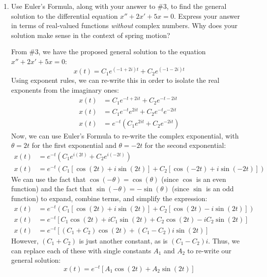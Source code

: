 \documentclass[main]{subfiles}
\begin{document}
\begin{enumerate}
\begin{enumerate}
    
\end{enumerate}
 \probonly{\end{multicols}}

\pspace{1.25in}

\item
{}

\begin{problem}[3in]
Use Euler's Formula, along with your answer to \#3, to find the general solution to the differential equation $x'' + 2x' + 5x = 0$. Express your answer in terms of real-valued functions \textit{without} complex numbers. Why does your solution make sense in the context of spring motion?
\end{problem}
  
\begin{solution}
From \#3, we have the proposed general solution to the equation $x'' + 2x' + 5x = 0$:
$$x(t)=C_1e^{(-1+2i)t}+C_2e^{(-1-2i)t}$$
Using exponent rules, we can re-write this in order to isolate the real exponents from the imaginary ones:
\begin{align*}
x(t)&=C_1e^{-t+2it}+C_2e^{-t-2it}\\
x(t)&=C_1e^{-t}e^{2it}+C_2e^{-t}e^{-2it}\\
x(t)&=e^{-t}\left(C_1e^{2it}+C_2e^{-2it}\right)
\end{align*}
Now, we can use Euler's Formula to re-write the complex exponential, with $\theta = 2t$ for the first exponential and $\theta =-2t$ for the second exponential:
\begin{align*}
x(t)&=e^{-t}\left(C_1e^{i(2t)}+C_2e^{i(-2t)}\right)\\
x(t)&=e^{-t}\left(C_1\left[\cos(2t)+i\sin(2t)\right]+C_2\left[\cos(-2t)+i\sin(-2t)\right]\right)
\end{align*}
We can use the fact that $\cos(-\theta)=\cos(\theta)$ (since $\cos$ is an even function) and the fact that $\sin(-\theta)=-\sin(\theta)$ (since $\sin$ is an odd function) to expand, combine terms, and simplify the expression:
\begin{align*}
x(t)&=e^{-t}\left(C_1\left[\cos(2t)+i\sin(2t)\right]+C_2\left[\cos(2t)-i\sin(2t)\right]\right)\\
x(t)&=e^{-t}\left[C_1\cos(2t)+iC_1\sin(2t)+C_2\cos(2t)-iC_2\sin(2t)\right]\\
x(t)&=e^{-t}\left[(C_1+C_2)\cos(2t)+(C_1-C_2)i\sin(2t)\right]
\end{align*}
However, $(C_1+C_2)$ is just another constant, as is $(C_1-C_2)i$. Thus, we can replace each of these with single constants $A_1$ and $A_2$ to re-write our general solution:
$$\boxed{x(t)=e^{-t}\left[A_1\cos(2t)+A_2\sin(2t)\right]}$$


\end{solution}
\end{enumerate}
\end{document}
